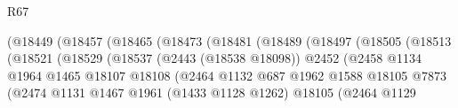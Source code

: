 \begin{lexlean}{R67}
\begin{coremodule}
                                              (@18449
                                                (@18457
                                                  (@18465
                                                    (@18473
                                                      (@18481
                                                        (@18489
                                                          (@18497
                                                            (@18505
                                                              (@18513
                                                                (@18521
                                                                  (@18529
                                                                    (@18537
                                                                      (@2443 (@18538 @18098))
                                                                      @2452
                                                                      (@2458
                                                                        @1134
                                                                        @1964
                                                                        @1465
                                                                        @18107
                                                                        @18108
                                                                        (@2464
                                                                          @1132
                                                                          @687
                                                                          @1962
                                                                          @1588
                                                                          @18105
                                                                          @7873
                                                                          (@2474
                                                                            @1131
                                                                            @1467
                                                                            @1961
                                                                            (@1433 @1128 @1262)
                                                                            @18105
                                                                            (@2464
                                                                              @1129

\end{coremodule}
\end{lexlean}

